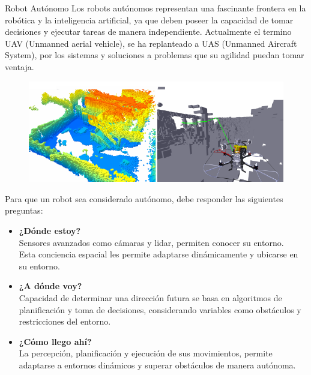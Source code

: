 \documentclass[final]{beamer}
\newlength{\colwidth}
\begin{document}
\begin{frame}[t]
\begin{columns}[t]
\begin{column}{\colwidth}
  \begin{block}{\color{teal}Robot Autónomo}
    Los robots autónomos representan una fascinante frontera en la robótica y la inteligencia artificial, ya que deben poseer la capacidad de tomar decisiones y ejecutar tareas de manera independiente.
    Actualmente el termino UAV (Unmanned aerial vehicle), se ha replanteado a UAS (Unmanned Aircraft System), por los sistemas y soluciones a problemas que su agilidad puedan tomar ventaja.\cite{UAV2020}
    \begin{figure}
      \centering
      \includegraphics[width=35cm]{images/auto_dro.png}
    \end{figure}

    Para que un robot sea considerado autónomo, debe responder las siguientes preguntas:
    \begin{multicols}{3}
      \begin{itemize}
      \item \textbf{¿Dónde estoy?}\\
        Sensores avanzados como cámaras y lidar, permiten conocer su entorno.\\
        Esta conciencia espacial les permite adaptarse dinámicamente y ubicarse en su entorno.\vspace{1cm}
      \item \textbf{¿A dónde voy?}\\
        Capacidad de determinar una dirección futura se basa en algoritmos de planificación y toma de decisiones, considerando variables como obstáculos y restricciones del entorno.\vspace{1cm}
      \item \textbf{¿Cómo llego ahí?}\\
        La percepción, planificación y ejecución de sus movimientos, permite adaptarse a entornos dinámicos y superar obstáculos de manera autónoma.
      \end{itemize}
    \end{multicols}
  \end{block}
\end{column}


\end{columns}
\end{frame}
\end{document}
